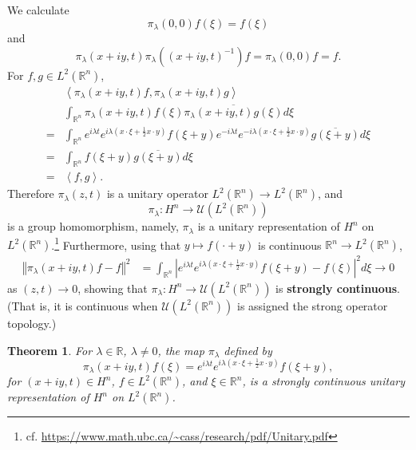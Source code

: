 \documentclass{article}
\newcommand{\inner}[2]{\left\langle #1, #2 \right\rangle}
\newcommand{\norm}[1]{\left\Vert #1 \right\Vert}
\newtheorem{theorem}{Theorem}
\theoremstyle{definition}
\begin{document}
We calculate
\[
\pi_\lambda(0,0) f(\xi) = f(\xi)
\]
and
\[
 \pi_\lambda(x+iy,t) \pi_\lambda((x+iy,t)^{-1}) f = 
\pi_\lambda(0,0)f = f.
\]
For $f,g \in L^2(\mathbb{R}^n)$,
\[
\begin{split}
&\inner{\pi_\lambda(x+iy,t)f}{\pi_\lambda(x+iy,t)g}\\
&\int_{\mathbb{R}^n} \pi_\lambda(x+iy,t)f(\xi) \overline{\pi_\lambda(x+iy,t)g(\xi)} d\xi\\
=&\int_{\mathbb{R}^n} 
e^{i\lambda t} e^{i\lambda\left(x\cdot \xi+\frac{1}{2}x\cdot y\right)} f(\xi+y)
e^{-i\lambda t} e^{-i\lambda\left(x\cdot \xi+\frac{1}{2}x\cdot y\right)} \overline{g(\xi+y)}
d\xi\\
=&\int_{\mathbb{R}^n} f(\xi+y) \overline{g(\xi+y)} d\xi\\
=&\inner{f}{g}.
\end{split}
\]
Therefore $\pi_\lambda(z,t)$ is a unitary operator $L^2(\mathbb{R}^n) \to L^2(\mathbb{R}^n)$, and
\[
\pi_\lambda:H^n \to \mathscr{U}(L^2(\mathbb{R}^n))
\]
 is a group homomorphism, namely, $\pi_\lambda$ is a unitary
representation of $H^n$ on $L^2(\mathbb{R}^n)$.\footnote{cf. \url{https://www.math.ubc.ca/~cass/research/pdf/Unitary.pdf}}
Furthermore, using that $y \mapsto f(\cdot+y)$ is continuous $\mathbb{R}^n \to L^2(\mathbb{R}^n)$, 
\begin{align*}
\norm{\pi_\lambda(x+iy,t) f -f}^2
&=\int_{\mathbb{R}^n} | e^{i\lambda t} e^{i\lambda\left(x\cdot \xi+\frac{1}{2}x\cdot y\right)} f(\xi+y) - f(\xi)|^2 d\xi \to 0
\end{align*}
as $(z,t) \to 0$, showing that $\pi_\lambda:H^n \to \mathscr{U}(L^2(\mathbb{R}^n))$ is \textbf{strongly continuous}. (That is, it is continuous when
$\mathscr{U}(L^2(\mathbb{R}^n))$ is assigned the strong
operator topology.)

\begin{theorem}
For $\lambda \in \mathbb{R}$, $\lambda \neq 0$, the map $\pi_\lambda$ defined by
\[
\pi_\lambda(x+iy,t)f(\xi) = e^{i\lambda t} e^{i\lambda\left(x\cdot \xi+\frac{1}{2}x\cdot y\right)} f(\xi+y),
\]
for $(x+iy,t) \in H^n$, $f \in L^2(\mathbb{R}^n)$, and $\xi \in \mathbb{R}^n$, is  a strongly continuous unitary representation of $H^n$
on $L^2(\mathbb{R}^n)$. 
\end{theorem}
\end{document}
